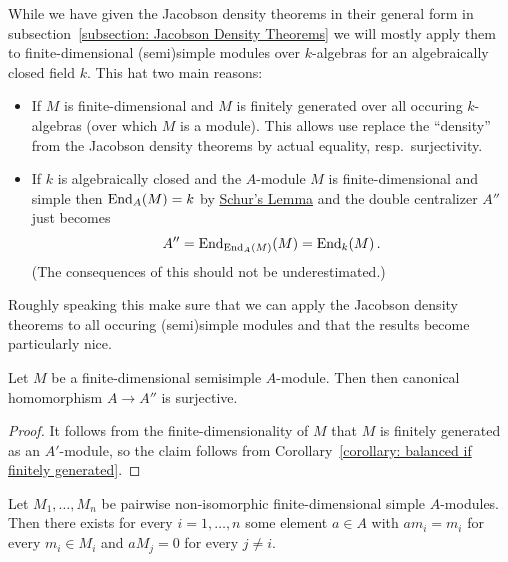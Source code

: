 \begin{fluff}
  While we have given the Jacobson density theorems in their general form in subsection~\ref{subsection: Jacobson Density Theorems} we will mostly apply them to finite-dimensional (semi)simple modules over $k$-algebras for an algebraically closed field $k$.
  This hat two main reasons:
  \begin{itemize}
    \item
      If $M$ is finite-dimensional and $M$ is finitely generated over all occuring $k$-algebras (over which $M$ is a module).
      This allows use replace the \enquote{density} from the Jacobson density theorems by actual equality, resp.\ surjectivity.
    \item
      If $k$ is algebraically closed and the $A$-module $M$ is finite-dimensional and simple then $\operatorname{End}_A(M) = k$ by \hyperref[proposition: schurs lemma for modules]{Schur’s Lemma} and the double centralizer $A''$ just becomes
      \[
          A''
        = \operatorname{End}_{\operatorname{End}_A(M)}(M)
        = \operatorname{End}_k(M) \,.
      \]
      (The consequences of this should not be underestimated.)
  \end{itemize}
  Roughly speaking this make sure that we can apply the Jacobson density theorems to all occuring (semi)simple modules and that the results become particularly nice.
\end{fluff}


\begin{lemma}
  \label{lemma: fd balanced are ss}
  Let $M$ be a finite-dimensional semisimple $A$-module.
  Then then canonical homomorphism $A \to A''$ is surjective.
\end{lemma}


\begin{proof}
  It follows from the finite-dimensionality of $M$ that $M$ is finitely generated as an $A'$-module, so the claim follows from Corollary~\ref{corollary: balanced if finitely generated}.
\end{proof}


\begin{corollary}
  \label{corollary: existence of projection operators}
  Let $M_1, \dotsc, M_n$ be pairwise non-isomorphic finite-dimensional simple $A$-modules.
  Then there exists for every $i = 1, \dotsc, n$ some element $a \in A$ with $a m_i = m_i$ for every $m_i \in M_i$ and $a M_j = 0$ for every $j \neq i$.
\end{corollary}


